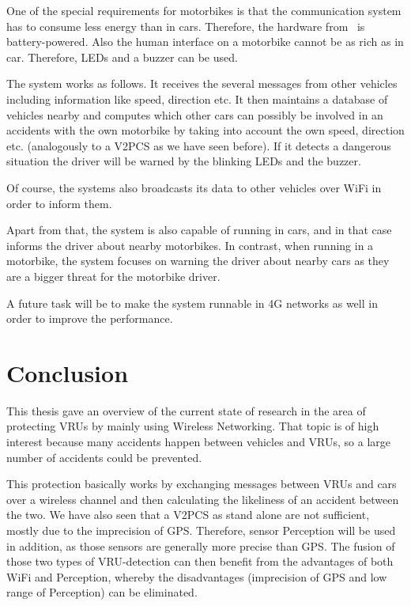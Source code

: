\documentclass[]{ccs-thesis}
\begin{document}
One of the special requirements for motorbikes is that the communication system has to consume less energy than in cars. Therefore, the hardware from~\cite{bikes} is battery-powered. Also the human interface on a motorbike cannot be as rich as in car. Therefore, LEDs and a buzzer can be used.

The system works as follows. It receives the several messages from other vehicles including information like speed, direction etc. It then maintains a database of vehicles nearby and computes which other cars can possibly be involved in an accidents with the own motorbike by taking into account the own speed, direction etc. (analogously to a \ac{V2PCS} as we have seen before). If it detects a dangerous situation the driver will be warned by the blinking LEDs and the buzzer.

Of course, the systems also broadcasts its data to other vehicles over WiFi in order to inform them.

Apart from that, the system is also capable of running in cars, and in that case informs the driver about nearby motorbikes. In contrast, when running in a motorbike, the system focuses on warning the driver about nearby cars as they are a bigger threat for the motorbike driver.

A future task will be to make the system runnable in 4G networks as well in order to improve the performance.

\chapter{Conclusion}
\label{chap:conclusion}


This thesis gave an overview of the current state of research in the area of protecting \acp{VRU} by mainly using Wireless Networking. That topic is of high interest because many accidents happen between vehicles and \acp{VRU}, so a large number of accidents could be prevented.

This protection basically works by exchanging messages between \acp{VRU} and cars over a wireless channel and then calculating the likeliness of an accident between the two. We have also seen that a \ac{V2PCS} as stand alone are not sufficient, mostly due to the imprecision of GPS. Therefore, sensor Perception will be used in addition, as those sensors are generally more precise than GPS. The fusion of those two types of \ac{VRU}-detection can then benefit from the advantages of both WiFi and Perception, whereby the disadvantages (imprecision of GPS and low range of Perception) can be eliminated.
\end{document}
